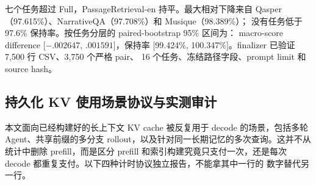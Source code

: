 {七个任务超过 Full，PassageRetrieval-en 持平。最大相对下降来自
Qasper（97.615\%）、NarrativeQA（97.708\%）和 Musique（98.389\%）；
没有任务低于 97.6\% 保持率。按任务分层的 paired-bootstrap 95\% 区间为：
macro-score difference [$-.002647$, $.001591$]，保持率
[99.424\%, 100.347\%]。finalizer 已验证 7,500 行 CSV、3,750 个严格 pair、
16 个任务、冻结路径字段、prompt limit 和 source hash。
}


\subsection{持久化 KV 使用场景协议与实测审计}
\label{app:persistent-kv-protocol}

本文面向已经构建好的长上下文 KV cache 被反复用于 decode 的场景，包括多轮
Agent、共享前缀的多分支 rollout，以及针对同一长期记忆的多次查询。这并不从
统计中删除 prefill，而是区分 prefill 和索引构建究竟只支付一次，还是每次
decode 都重复支付。以下四种计时协议独立报告，不能拿其中一行的
数字替代另一行。


